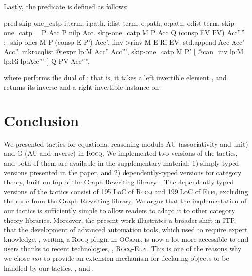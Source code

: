 \documentclass[a4paper,UKenglish,cleveref,autoref]{lipics-v2021}
\newcommand{\Rocq}{{\sffamily\scshape Rocq}\xspace}
\newcommand{\Elpi}{{\sffamily\scshape Elpi}\xspace}
\newcommand{\RocqElpi}{{\sffamily\scshape Rocq-Elpi}\xspace}
\newcommand{\OCaml}{{\sffamily\scshape OCaml}\xspace}
\begin{document}
Lastly, the  predicate is defined as follows:
\begin{elpicode}
pred skip-one_catp i:term, i:path, i:list term, o:path, o:path, o:list term.
skip-one_catp _ P Acc P nilp Acc.
skip-one_catp M P Acc Q (consp EV PV) Acc'''' :-
  skip-ones M P (consp E P') Acc',
  linv->rinv M E Ri EV,
  std.append Acc Acc' Acc'', %
  mkrocqlist {{ @iexpr lp:M }} Acc'' Acc''',
  skip-one_catp M P' [{{ @can_inv lp:M lp:Ri lp:Acc''' }}] Q PV Acc''''.
\end{elpicode}
where  performs the dual of ; that is, it takes a left invertible
element , and returns its inverse  and a right invertible instance  on
.

\section{Conclusion}
\label{sec:conclusion}

We presented tactics for equational reasoning modulo AU (associativity and unit) and G (AU and
inverse) in \Rocq.
We implemented two versions of the tactics, and both of them are available in the supplementary
material:
1) simply-typed versions presented in the paper, and
2) dependently-typed versions for category theory, built on top of the Graph Rewriting
library~\cite{DBLP:conf/cpp/ArsacHP26}.
The dependently-typed versions of the tactics consist of 195 LoC of \Rocq and 199 LoC of \Elpi,
excluding the code from the Graph Rewriting library.
We argue that the implementation of our tactics is sufficiently simple to allow readers to adapt it
to other category theory libraries.
Moreover, the present work illustrates a broader shift in ITP, that the development of advanced
automation tools, which used to require expert knowledge, \eg, writing a \Rocq plugin in \OCaml, is
now a lot more accessible to end users thanks to recent technologies, \eg, \RocqElpi.
This is one of the reasons why we chose \emph{not} to provide an extension mechanism for declaring
objects to be handled by our tactics, \eg, \cite[Section 2]{DBLP:conf/cpp/BraibantP11} and
\cite[Section 6.2]{DBLP:conf/tphol/GregoireM05}.
\end{document}
